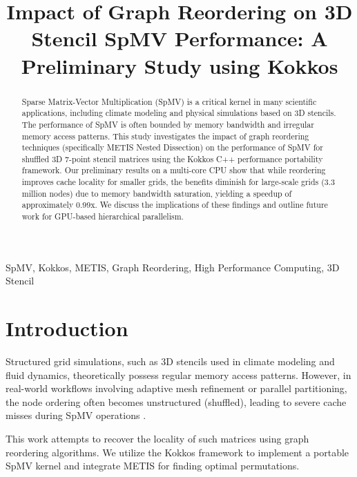 \documentclass[conference]{IEEEtran}
\begin{document}
\title{Impact of Graph Reordering on 3D Stencil SpMV Performance: A Preliminary Study using Kokkos}

\author{
}

\maketitle

\begin{abstract}
Sparse Matrix-Vector Multiplication (SpMV) is a critical kernel in many scientific applications, including climate modeling and physical simulations based on 3D stencils. The performance of SpMV is often bounded by memory bandwidth and irregular memory access patterns. This study investigates the impact of graph reordering techniques (specifically METIS Nested Dissection) on the performance of SpMV for shuffled 3D 7-point stencil matrices using the Kokkos C++ performance portability framework. Our preliminary results on a multi-core CPU show that while reordering improves cache locality for smaller grids, the benefits diminish for large-scale grids (3.3 million nodes) due to memory bandwidth saturation, yielding a speedup of approximately 0.99x. We discuss the implications of these findings and outline future work for GPU-based hierarchical parallelism.
\end{abstract}

\begin{IEEEkeywords}
SpMV, Kokkos, METIS, Graph Reordering, High Performance Computing, 3D Stencil
\end{IEEEkeywords}

\section{Introduction}
Structured grid simulations, such as 3D stencils used in climate modeling and fluid dynamics, theoretically possess regular memory access patterns. However, in real-world workflows involving adaptive mesh refinement or parallel partitioning, the node ordering often becomes unstructured (shuffled), leading to severe cache misses during SpMV operations \cite{buluc2025}.

This work attempts to recover the locality of such matrices using graph reordering algorithms. We utilize the Kokkos framework \cite{trott2022} to implement a portable SpMV kernel and integrate METIS \cite{karypis1998} for finding optimal permutations.
\end{document}
